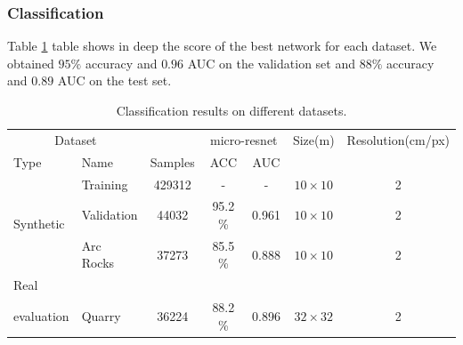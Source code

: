 \documentclass[../document.tex]{subfiles}
\begin{document}
\subsubsection{Classification}
Table \ref{tab : classification-results} table shows in deep the score of the best network for each dataset. We obtained $95\%$ accuracy and $0.96$ AUC on the validation set and $88\%$ accuracy and $0.89$ AUC on the test set.
\begin{table}[htbp]
    \centering
    \begin{tabular}{@{}llccccc@{}}
    \toprule
    \multicolumn{2}{c}{Dataset} && \multicolumn{2}{c}{micro-resnet} & Size(m) & Resolution(cm/px) \\
    \cmidrule{1-2} \cmidrule{4-5}
    Type     &  Name  & Samples & ACC  &  AUC    & & \\
    \toprule
      \multirow{3}{*}{Synthetic}  & Training   & 429312 & - & - & $10\times10$ & 2\\
      &  Validation   & 44032 &  95.2 \% &  0.961 & $10\times10$ & 2 \\
      & Arc Rocks & 37273 &  85.5 \% &  0.888 & $10\times10$ & 2 \\
      \cmidrule{2-7}
    Real\\evaluation & Quarry & 36224 &  88.2 \%&  0.896& $32\times32$ & 2\\
    \bottomrule   
\end{tabular}
\caption{Classification results on different datasets.}
\label{tab : classification-results}
\end{table}
\end{document}
